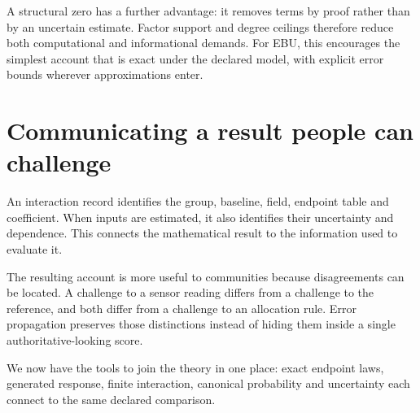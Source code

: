 A structural zero has a further advantage: it removes terms by proof rather than by an uncertain estimate. Factor support and degree ceilings therefore reduce both computational and informational demands. For EBU, this encourages the simplest account that is exact under the declared model, with explicit error bounds wherever approximations enter.

\section{Communicating a result people can challenge}
An interaction record identifies the group, baseline, field, endpoint table and coefficient. When inputs are estimated, it also identifies their uncertainty and dependence. This connects the mathematical result to the information used to evaluate it.

The resulting account is more useful to communities because disagreements can be located. A challenge to a sensor reading differs from a challenge to the reference, and both differ from a challenge to an allocation rule. Error propagation preserves those distinctions instead of hiding them inside a single authoritative-looking score.

We now have the tools to join the theory in one place: exact endpoint laws, generated response, finite interaction, canonical probability and uncertainty each connect to the same declared comparison.
